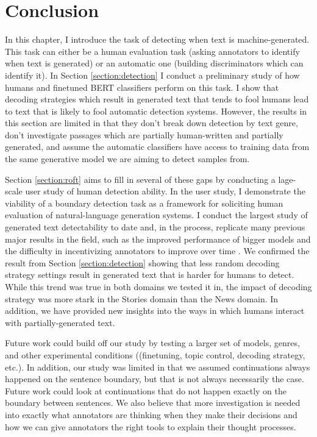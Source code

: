 \section{Conclusion}
In this chapter, I introduce the task of detecting when text is machine-generated.
This task can either be a human evaluation task (asking annotators to identify when text is generated) or an automatic one (building discriminators which can identify it).
In Section \ref{section:detection} I conduct a preliminary study of how humans and finetuned BERT classifiers perform on this task.
I show that decoding strategies which result in generated text that tends to fool humans lead to text that is likely to fool automatic detection systems.
However, the results in this section are limited in that they don't break down detection by text genre, don't investigate passages which are partially human-written and partially generated, and assume the automatic classifiers have access to training data from the same generative model we are aiming to detect samples from.

Section \ref{section:roft} aims to fill in several of these gaps by conducting a lage-scale user study of human detection ability.
In the \ROFT{} user study, I demonstrate the viability of a boundary detection task as a framework for soliciting human evaluation of natural-language generation systems.
I conduct the largest study of generated text detectability to date and, in the process, replicate many previous major results in the field, such as the improved performance of bigger models \citep{kaplan2020scaling} and the difficulty in incentivizing annotators to improve over time \citep{clark2021all}.
We confirmed the result from Section \ref{section:detection} showing that less random decoding strategy settings result in generated text that is harder for humans to detect.
While this trend was true in both domains we tested it in, the impact of decoding strategy was more stark in the Stories domain than the News domain.
In addition, we have provided new insights into the ways in which humans interact with partially-generated text.

Future work could build off our study by testing a larger set of models, genres, and other experimental conditions ((finetuning, topic control, decoding strategy, etc.).
In addition, our study was limited in that we assumed continuations always happened on the sentence boundary, but that is not always necessarily the case.
Future work could look at continuations that do not happen exactly on the boundary between sentences.
We also believe that more investigation is needed into exactly what annotators are thinking when they make their decisions and how we can give annotators the right tools to explain their thought processes.


